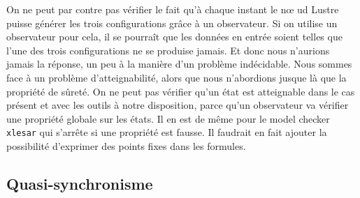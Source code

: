 \documentclass[a4paper]{article}
\begin{document}
On ne peut par contre pas vérifier le fait qu'à chaque instant le n\oe
ud Lustre puisse générer les trois configurations grâce à un
observateur. Si on utilise un observateur pour cela, il se pourraît que
les données en entrée soient telles que l'une des trois configurations
ne se produise jamais. Et donc nous n'aurions jamais la réponse, un
peu à la manière d'un problème indécidable. Nous sommes face à un problème
d'atteignabilité, alors que nous n'abordions jusque là que la propriété de
sûreté. On ne peut pas vérifier qu'un état est atteignable
dans le cas présent et avec les outils à notre disposition, parce
qu'un observateur va vérifier une propriété globale sur les états. Il
en est de même pour le model checker \texttt{xlesar} qui s'arrête si
une propriété est fausse. Il faudrait en fait ajouter la possibilité
d'exprimer des points fixes dans les formules.

\subsection{Quasi-synchronisme}
\end{document}
